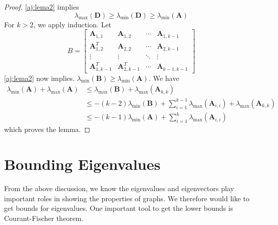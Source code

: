 \documentclass{article}
\begin{document}
\begin{proof}
\cref{aj:lema2}  implies
$$
\lambda_{\max }(\boldsymbol{D}) \geq \lambda_{\min }(\boldsymbol{D}) \geq \lambda_{\min }(\boldsymbol{A})
$$
For $k>2$, we apply induction. Let
$$
B=\left[\begin{array}{cccc}
\boldsymbol{A}_{1,1} & \boldsymbol{A}_{1,2} & \cdots & \boldsymbol{A}_{1, k-1} \\
\boldsymbol{A}_{1,2}^{T} & \boldsymbol{A}_{2,2} & \cdots & \boldsymbol{A}_{2, k-1} \\
\vdots & \vdots & \ddots & \vdots \\
\boldsymbol{A}_{1, k-1}^{T} & \boldsymbol{A}_{2, k-1}^{T} & \cdots & \boldsymbol{A}_{k-1, k-1}
\end{array}\right]
$$
\cref{aj:lema2}  now implies. $\lambda_{\min }(\boldsymbol{B}) \geq \lambda_{\min }(\boldsymbol{A})$. We have
\begin{align*}
\lambda_{\min }(\boldsymbol{A})+\lambda_{\max }(\boldsymbol{A}) & \leq \lambda_{\max }(\boldsymbol{B})+\lambda_{\max }\left(\boldsymbol{A}_{k, k}\right) \\
& \leq-(k-2) \lambda_{\min }(\boldsymbol{B})+\sum_{i=1}^{k-1} \lambda_{\max }\left(\boldsymbol{A}_{i, i}\right)+\lambda_{\max }\left(\boldsymbol{A}_{k, k}\right)\\
&\leq-(k-1) \lambda_{\min }(\boldsymbol{A})+\sum_{i=1}^{k} \lambda_{\max }\left(\boldsymbol{A}_{i, i}\right)
\end{align*}
which proves the lemma.

\end{proof} 

\section{Bounding Eigenvalues}
From the above discussion, we know the eigenvalues and eigenvectors play important roles in showing the properties of graphs. We therefore would like to get bounds for eigenvalues. One important tool to get the lower bounds is Courant-Fischer theorem.
\end{document}
